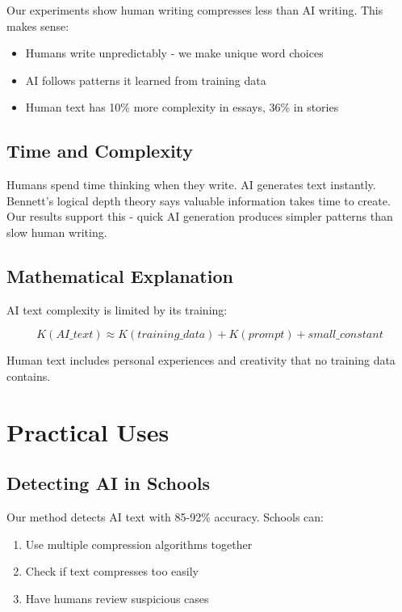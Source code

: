 \documentclass[12pt,a4paper]{report}
\begin{document}
Our experiments show human writing compresses less than AI writing. This makes sense:

\begin{itemize}
    \item Humans write unpredictably - we make unique word choices
    \item AI follows patterns it learned from training data
    \item Human text has 10\% more complexity in essays, 36\% in stories
\end{itemize}

\subsection{Time and Complexity}

Humans spend time thinking when they write. AI generates text instantly. Bennett's logical depth theory says valuable information takes time to create. Our results support this - quick AI generation produces simpler patterns than slow human writing.

\subsection{Mathematical Explanation}

AI text complexity is limited by its training:

\begin{equation}
K(AI\_text) \approx K(training\_data) + K(prompt) + small\_constant
\end{equation}

Human text includes personal experiences and creativity that no training data contains.

\section{Practical Uses}

\subsection{Detecting AI in Schools}

Our method detects AI text with 85-92\% accuracy. Schools can:

\begin{enumerate}
    \item Use multiple compression algorithms together
    \item Check if text compresses too easily
    \item Have humans review suspicious cases
\end{enumerate}
\end{document}
